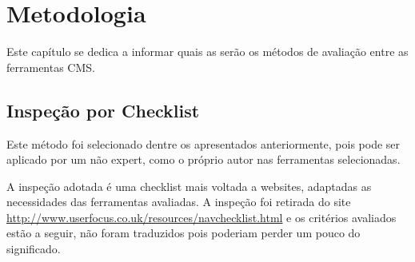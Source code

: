 \chapter{Metodologia}

Este capítulo se dedica a informar quais as serão os métodos de avaliação entre as ferramentas CMS.  

\section{Inspeção por Checklist}

Este método foi selecionado dentre os apresentados anteriormente, pois pode ser aplicado por um não expert, como o próprio autor nas ferramentas selecionadas.

A inspeção adotada é uma checklist mais voltada a websites, adaptadas as necessidades das ferramentas avaliadas. A inspeção foi retirada do site \url{http://www.userfocus.co.uk/resources/navchecklist.html} e os critérios avaliados estão a seguir, não foram traduzidos pois poderiam perder um pouco do significado.

